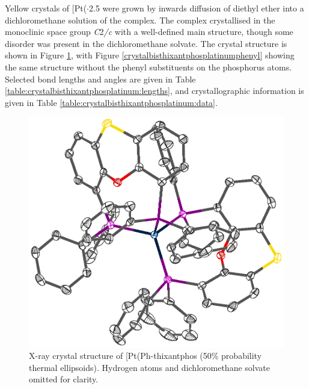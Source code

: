 Yellow crystals of [Pt(\Phthixantphos\ce{)2]}$\cdot$2.5  were grown by inwards diffusion of diethyl ether into a dichloromethane solution of the complex.  The complex crystallised in the monoclinic space group \emph{C}2\emph{/c} with a well-defined main structure, though some disorder was present in the dichloromethane solvate.  The crystal structure is shown in Figure \ref{crystalbisthixantphosplatinum}, with Figure \ref{crystalbisthixantphosplatinumphenyl} showing the same structure without the phenyl substituents on the phosphorus atoms.  Selected bond lengths and angles are given in Table \ref{table:crystalbisthixantphosplatinum:lengths}, and crystallographic information is given in Table \ref{table:crystalbisthixantphosplatinum:data}.  


\begin{figure}[htbp]
\begin{center}
\includegraphics[scale=0.8]{../Figures/MRMNANlabelled3.eps}
\caption[X-ray crystal structure of [Pt(Ph-thixantphos\ce{)2]}]{X-ray crystal structure of [Pt(Ph-thixantphos\ce{)2]} (50\% probability thermal ellipsoids).  Hydrogen atoms and dichloromethane solvate omitted for clarity.}
\label{crystalbisthixantphosplatinum}
\end{center}
\end{figure}

